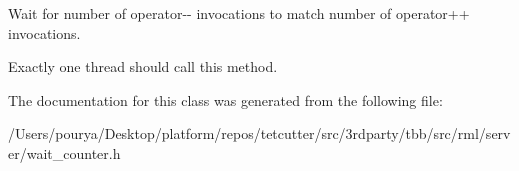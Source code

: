 Wait for number of operator-\/-\/ invocations to match number of operator++ invocations. 

Exactly one thread should call this method. 

The documentation for this class was generated from the following file\+:\begin{DoxyCompactItemize}
\item 
/\+Users/pourya/\+Desktop/platform/repos/tetcutter/src/3rdparty/tbb/src/rml/server/wait\+\_\+counter.\+h\end{DoxyCompactItemize}
